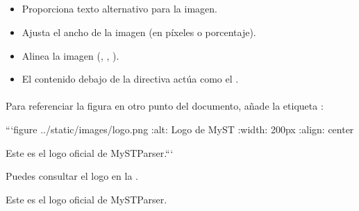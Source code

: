 \documentclass[a4paper,10pt,oneside,spanish,openany]{sphinxmanual}
\begin{document}
\subparagraph{}
\label{\detokenize{configuracion_inicial/013.guia_de_myst_parser:explicacion}}\begin{itemize}
\item {} 
\sphinxAtStartPar
{} Proporciona texto alternativo para la imagen.

\item {} 
\sphinxAtStartPar
{} Ajusta el ancho de la imagen (en píxeles o porcentaje).

\item {} 
\sphinxAtStartPar
{} Alinea la imagen (, , ).

\item {} 
\sphinxAtStartPar
El contenido debajo de la directiva actúa como el .

\end{itemize}


\paragraph{}
\label{\detokenize{configuracion_inicial/013.guia_de_myst_parser:referencia-cruzada-a-una-figura}}
\sphinxAtStartPar
Para referenciar la figura en otro punto del documento, añade la etiqueta :

\begin{sphinxVerbatim}[commandchars=\\\{\}]
  ```\PYGZob{}figure\PYGZcb{} ../\PYGZus{}static/images/logo.png
  :alt: Logo de MyST
  :width: 200px
  :align: center

  Este es el logo oficial de MyST\PYGZhy{}Parser.```
\end{sphinxVerbatim}

\sphinxAtStartPar
Puedes consultar el logo en la {\hyperref[\detokenize{configuracion_inicial/013.guia_de_myst_parser:fig-logo}]{}}.\textasciigrave{}

\sphinxAtStartPar
{}

\sphinxAtStartPar
{}

\sphinxAtStartPar
{} Este es el logo oficial de MyST\sphinxhyphen{}Parser.
\end{document}
